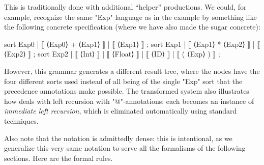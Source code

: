 \documentclass[11pt]{article} %
\begin{document}
{\small\begin{remark}
This is traditionally done with additional ``helper'' productions. We could, for example, recognize
the same "Exp" language as in the example by something like the following concrete \HAX
specification (where we have also made the sugar concrete):
\begin{hacs}[xleftmargin=\parindent]
sort Exp0  | ⟦ ⟨Exp0⟩ + ⟨Exp1⟩ ⟧ | ⟦ ⟨Exp1⟩ ⟧ ;
sort Exp1  | ⟦ ⟨Exp1⟩ * ⟨Exp2⟩ ⟧ | ⟦ ⟨Exp2⟩ ⟧ ;
sort Exp2  | ⟦ ⟨Int⟩ ⟧ | ⟦ ⟨Float⟩ ⟧ | ⟦ ⟨ID⟩ ⟧ | ⟦ ( ⟨Exp⟩ ) ⟧ ;
\end{hacs}%
However, this grammar generates a different result tree, where the nodes have the four different
sorts used instead of all being of the single "Exp" sort that the precedence annotations make
possible.  The transformed system also illustrates how \HAX deals with left recursion with
"@"-annotations: each becomes an instance of \emph{immediate left recursion}, which is eliminated
automatically using standard techniques.
\end{remark}}

Also note that the notation is admittedly dense: this is intentional, as we generalize this very
same notation to serve all the formalisms of the following sections.  Here are the formal rules.
\end{document}
